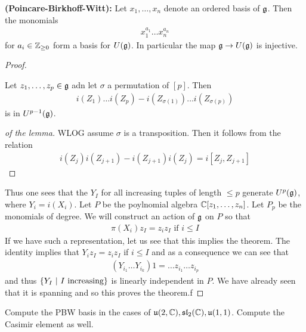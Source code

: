 \documentclass[12pt]{article}
\begin{document}
\begin{theorem}
\textbf{(Poincare-Birkhoff-Witt):}
Let $x_1,\dots,x_n$ denote an ordered basis of $\mathfrak{g}$. Then the monomials 
\begin{align*}
    x_1^{a_1}\dots x_n^{a_n}
\end{align*} for $a_i\in\mathbb{Z}_{\geq 0}$ form a basis for $U(\mathfrak{g})$. In particular the map $\mathfrak{g}\to U(\mathfrak{g})$ is injective.
\end{theorem}
\begin{proof}

\begin{lemma}
Let $z_1,\dots,z_p \in \mathfrak{g}$ adn let $\sigma$ a permutation of $[p]$. Then 
\begin{align*}
    i(Z_1)\dots i(Z_p) - i(Z_{\sigma(1)}) \dots i(Z_{\sigma(p)})
\end{align*} is in $U^{p-1}(\mathfrak{g})$. 
\end{lemma}
\begin{proof}[of the lemma]
WLOG assume $\sigma$ is a transposition. Then it follows from the relation \begin{align}
    i(Z_j)i(Z_{j+1}) - i(Z_{j+1})i(Z_j) = i[Z_j,Z_{j+1}] 
\end{align}
\end{proof}
Thus one sees that the $Y_I$ for all increasing tuples of length $\leq p$ generate $U^p(\mathfrak{g})$, where $Y_i= i(X_i)$.
Let $P$ be the poylnomial algebra $\mathbb{C}[z_1,\dots,z_n]$. Let $P_p$ be the monomials of degree.
We will construct an action of $\mathfrak{g}$ on $P$ so that \begin{align}
    \pi(X_i)z_I = z_iz_I \text{ if $i\leq I$}
\end{align}
If we have such a representation, let us see that this implies the theorem. The 
identity implies that $Y_iz_I = z_iz_I$ if $i\leq I$ and as a consequence we can see that \begin{align*}
    (Y_{i_1}\dots Y_{i_k})1 = \dots z_{i_1}\dots z_{i_p}
\end{align*} and thus $\{Y_I \ \vert \  I \text{ increasing}\}$ is linearly 
independent in $P$. We have already seen that it is spanning and so this proves the theorem.f
\end{proof}
\begin{example}
    Compute the PBW basis in the cases of $\mathfrak{u}(2,\mathbb{C}),\mathfrak{sl}_2(\mathbb{C}),\mathfrak{u}(1,1)$. Compute the Casimir element as well.
\end{example}
\end{document}
